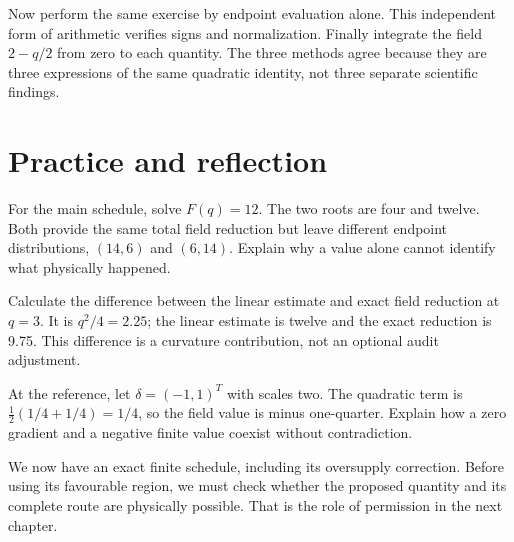 Now perform the same exercise by endpoint evaluation alone. This independent form of arithmetic verifies signs and normalization. Finally integrate the field \(2-q/2\) from zero to each quantity. The three methods agree because they are three expressions of the same quadratic identity, not three separate scientific findings.

\section{Practice and reflection}
For the main schedule, solve \(F(q)=12\). The two roots are four and twelve. Both provide the same total field reduction but leave different endpoint distributions, \((14,6)\) and \((6,14)\). Explain why a value alone cannot identify what physically happened.

Calculate the difference between the linear estimate and exact field reduction at \(q=3\). It is \(q^2/4=2.25\); the linear estimate is twelve and the exact reduction is 9.75. This difference is a curvature contribution, not an optional audit adjustment.

At the reference, let \(\delta=(-1,1)^T\) with scales two. The quadratic term is \(\tfrac12(1/4+1/4)=1/4\), so the field value is minus one-quarter. Explain how a zero gradient and a negative finite value coexist without contradiction.

We now have an exact finite schedule, including its oversupply correction. Before using its favourable region, we must check whether the proposed quantity and its complete route are physically possible. That is the role of permission in the next chapter.
